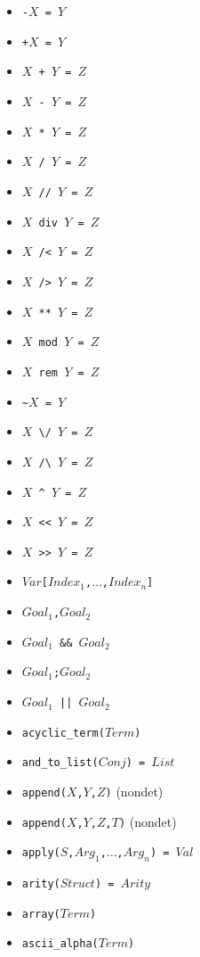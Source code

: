\documentclass[10pt]{article}
\begin{document}
\begin{multicols}{2}
\begin{scriptsize}
\begin{itemize}
    \item {\tt \verb+-+$X$ = $Y$}
    \item {\tt \verb-+-$X$ = $Y$}
    \item {\tt $X$ \verb-+- $Y$ = $Z$} 
    \item {\tt $X$ \verb+-+ $Y$ = $Z$} 
    \item {\tt $X$ \verb+*+ $Y$ = $Z$} 
    \item {\tt $X$ \verb+/+ $Y$ = $Z$} 
    \item {\tt $X$ \verb+//+ $Y$ = $Z$} 
    \item \texttt{$X$ div $Y$ = $Z$} 
    \item {\tt $X$ \verb+/<+ $Y$ = $Z$} 
    \item {\tt $X$ \verb+/>+ $Y$ = $Z$} 
    \item {\tt $X$ \verb+**+ $Y$ = $Z$} 
    \item \texttt{$X$ mod $Y$ = $Z$} 
    \item \texttt{$X$ rem $Y$ = $Z$} 
    \item {\tt \verb+~+$X$ = $Y$} 
    \item {\tt $X$ \verb+\/+ $Y$ = $Z$} 
    \item {\tt $X$ \verb+/\+ $Y$ = $Z$} 
    \item {\tt $X$ \verb+^+ $Y$ = $Z$} 
    \item {\tt $X$ \verb+<<+ $Y$ = $Z$} 
    \item {\tt $X$ \verb+>>+ $Y$ = $Z$} 
    \item {\tt $Var$\verb+[+$Index_1$,$\ldots$,$Index_n$\verb+]+}
    \item \texttt{$Goal_1$,$Goal_2$}
    \item \texttt{$Goal_1$ \&\& $Goal_2$}
    \item \texttt{$Goal_1$;$Goal_2$}
    \item \texttt{$Goal_1$ || $Goal_2$}
    \item \texttt{acyclic\_term($Term$)}
    \item \texttt{and\_to\_list($Conj$) = $List$}
    \item \texttt{append($X$,$Y$,$Z$)}  (nondet)
    \item \texttt{append($X$,$Y$,$Z$,$T$)}  (nondet)
    \item \texttt{apply($S$,$Arg_1$,$\ldots$,$Arg_n$) = $Val$} 
    \item \texttt{arity($Struct$) = $Arity$}
    \item \texttt{array($Term$)}
    \item \texttt{ascii\_alpha($Term$)}

\end{itemize}
\end{scriptsize}
\end{multicols}
\end{document}
